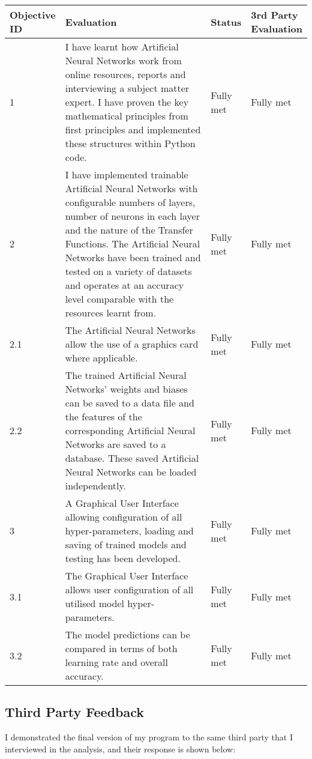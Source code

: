 \documentclass[./project-report/src/latex/project-report.tex]{subfiles}
\begin{document}
\begin{tabular}{|p{0.13\linewidth}|p{0.59\linewidth}|p{0.12\linewidth}|p{0.16\linewidth}|}
    \hline
    \textbf{Objective ID} & \textbf{Evaluation} & \textbf{Status} & \textbf{3rd Party Evaluation} \\
    \hline
    1 & I have learnt how Artificial Neural Networks work from online resources, reports and interviewing a subject matter expert. I have proven the key mathematical principles from first principles 
        and implemented these structures within Python code. & Fully met & Fully met \\
    \hline
    2 & I have implemented trainable Artificial Neural Networks with configurable numbers of layers, number of neurons in each layer and the nature of the Transfer Functions. The Artificial Neural 
        Networks have been trained and tested on a variety of datasets and operates at an accuracy level comparable with the resources learnt from. & Fully met & Fully met \\
    \hline
    2.1 & The Artificial Neural Networks allow the use of a graphics card where applicable. & Fully met & Fully met \\
    \hline
    2.2 & The trained Artificial Neural Networks' weights and biases can be saved to a data file and the features of the corresponding Artificial Neural Networks are saved to a database. These saved 
          Artificial Neural Networks can be loaded independently. & Fully met & Fully met \\
    \hline
    3 & A Graphical User Interface allowing configuration of all hyper-parameters, loading and saving of trained models and testing has been developed. & Fully met & Fully met \\
    \hline
    3.1 & The Graphical User Interface allows user configuration of all utilised model hyper-parameters. & Fully met & Fully met \\
    \hline
    3.2 & The model predictions can be compared in terms of both learning rate and overall accuracy. & Fully met & Fully met \\
    \hline
\end{tabular}

\subsection{Third Party Feedback}

I demonstrated the final version of my program to the same third party that I interviewed in the analysis, and their response is shown below:
\end{document}
